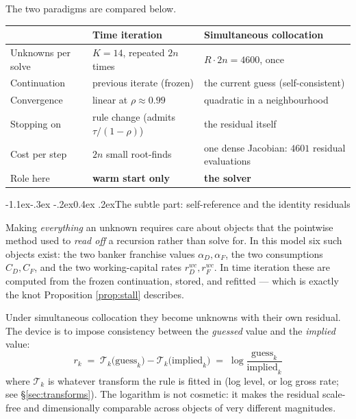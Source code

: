 \documentclass[10pt,a4paper]{article}
\makeatletter
\theoremstyle{definition}
\theoremstyle{plain}
\theoremstyle{remark}
\renewcommand\subsection{\@startsection{subsection}{2}{\z@}%
  {-1.1ex\@plus -.3ex \@minus -.2ex}{0.4ex \@plus .2ex}{\normalfont\normalsize\bfseries}}
\makeatother
\begin{document}
The two paradigms are compared below.
\begin{center}\small
\begin{tabular}{@{}p{}p{}p{}@{}}
\toprule
 & \textbf{Time iteration} & \textbf{Simultaneous collocation} \\
\midrule
Unknowns per solve & $K=14$, repeated $2n$ times & $R\cdot2n = 4600$, once \\
Continuation & previous iterate (frozen) & the current guess (self-consistent) \\
Convergence & linear at $\rho\approx 0.99$ & quadratic in a neighbourhood \\
Stopping on & rule change (admits $\tau/(1{-}\rho)$) & the residual itself \\
Cost per step & $2n$ small root-finds & one dense Jacobian: $4601$ residual evaluations \\
Role here & \textbf{warm start only} & \textbf{the solver} \\
\bottomrule
\end{tabular}
\end{center}

\subsection{The subtle part: self-reference and the identity residuals}

Making \emph{everything} an unknown requires care about objects that the pointwise method
used to \emph{read off} a recursion rather than solve for. In this model six such objects
exist: the two banker franchise values $\alpha_D,\alpha_F$, the two consumptions
$C_D,C_F$, and the two working-capital rates $r^{wc}_D, r^{wc}_F$. In time iteration these are
computed from the frozen continuation, stored, and refitted --- which is exactly the knot
Proposition \ref{prop:stall} describes.

Under simultaneous collocation they become unknowns with their own residual. The device is
to impose consistency between the \emph{guessed} value and the \emph{implied} value:
\begin{equation}
  \boxed{\;r_k \;=\; \mathcal{T}_{\!k}\big(\text{guess}_k\big) - \mathcal{T}_{\!k}\big(\text{implied}_k\big)
  \;=\; \log\frac{\text{guess}_k}{\text{implied}_k}\;}
  \label{eq:identity}
\end{equation}
where $\mathcal{T}_k$ is whatever transform the rule is fitted in (log level, or log gross
rate; see \S\ref{sec:transforms}). The logarithm is not cosmetic: it makes the residual
scale-free and dimensionally comparable across objects of very different magnitudes.
\end{document}
